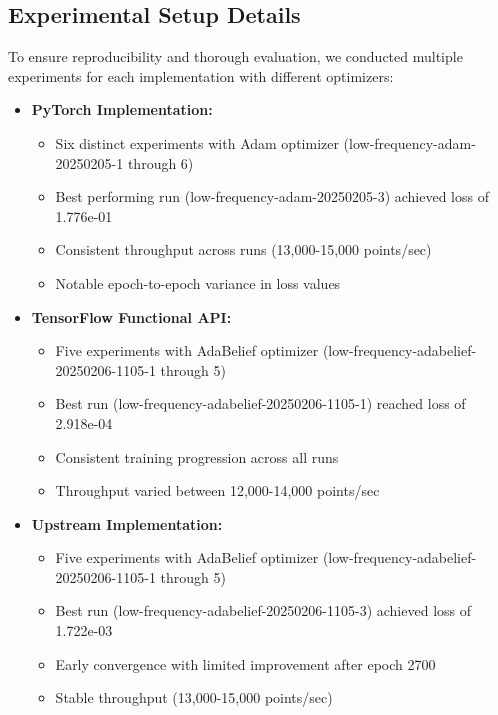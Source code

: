 \documentclass[10pt,journal,compsoc,onecolumn]{IEEEtran}
\begin{document}
\subsection{Experimental Setup Details}
To ensure reproducibility and thorough evaluation, we conducted multiple experiments for each implementation with different optimizers:

\begin{itemize}
    \item \textbf{PyTorch Implementation:}
    \begin{itemize}
        \item Six distinct experiments with Adam optimizer (low-frequency-adam-20250205-1 through 6)
        \item Best performing run (low-frequency-adam-20250205-3) achieved loss of 1.776e-01
        \item Consistent throughput across runs (13,000-15,000 points/sec)
        \item Notable epoch-to-epoch variance in loss values
    \end{itemize}
    
    \item \textbf{TensorFlow Functional API:}
    \begin{itemize}
        \item Five experiments with AdaBelief optimizer (low-frequency-adabelief-20250206-1105-1 through 5)
        \item Best run (low-frequency-adabelief-20250206-1105-1) reached loss of 2.918e-04
        \item Consistent training progression across all runs
        \item Throughput varied between 12,000-14,000 points/sec
    \end{itemize}
    
    \item \textbf{Upstream Implementation:}
    \begin{itemize}
        \item Five experiments with AdaBelief optimizer (low-frequency-adabelief-20250206-1105-1 through 5)
        \item Best run (low-frequency-adabelief-20250206-1105-3) achieved loss of 1.722e-03
        \item Early convergence with limited improvement after epoch 2700
        \item Stable throughput (13,000-15,000 points/sec)
    \end{itemize}
\end{itemize}
\end{document}
